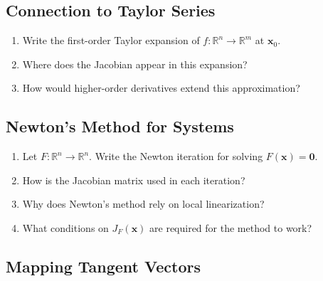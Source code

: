 \subsection{Connection to Taylor Series}

\begin{enumerate}[resume]
  \item Write the first-order Taylor expansion of \(f : \mathbb{R}^{n} \to \mathbb{R}^{m}\) at \(\mathbf{x}_{0}\).
  \item Where does the Jacobian appear in this expansion?
  \item How would higher-order derivatives extend this approximation?
\end{enumerate}

\subsection{Newton's Method for Systems}

\begin{enumerate}[resume]
  \item Let \(F : \mathbb{R}^{n} \to \mathbb{R}^{n}\). Write the Newton iteration for solving \(F(\mathbf{x}) = \mathbf{0}\).
  \item How is the Jacobian matrix used in each iteration?
  \item Why does Newton's method rely on local linearization?
  \item What conditions on \(J_{F}(\mathbf{x})\) are required for the method to work?
\end{enumerate}

\subsection{Mapping Tangent Vectors}

